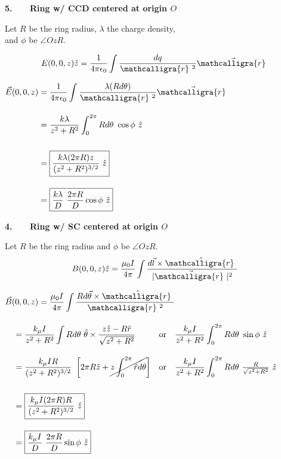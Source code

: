 \documentclass[12pt]{article}
\newcommand{\scripty}[1]{\ensuremath{\mathcalligra{#1}}}
\newcommand*{\cursrr}{\scripty{r}\ }
\begin{document}
\vspace{10pt}\noindent
\begin{minipage}[t]{.37\textwidth}
	\textbf{5. \ \ \ Ring w/ CCD centered at origin \(O\)}
	
	\vspace{10pt}
	Let \(R\) be the ring radius, \(\lambda\) the charge density, \\[7pt]
	and \(\phi\) be \(\angle OzR\).

	\vspace{5pt}
	\[ \displaystyle E(0,0,z) \hat{z} = \frac{1}{4 \pi \epsilon_0} \int \frac{dq}{\cursrr^2} \vec{\cursrr}\]

	\vspace{10pt}
	\(\begin{aligned}
		\vec{E}(0,0,z) &= \frac{1}{4 \pi \epsilon_0} \int \frac{\lambda (R d\theta)}{\cursrr^2} \vec{\cursrr}\\[10pt]
		&= \frac{k \lambda}{z^2 + R^2} \int_0^{2\pi} Rd\theta\ \cos{\phi}\ \hat{z} \\[15pt]
		&= \boxed{ \frac{k \lambda (2\pi R) z}{(z^2 + R^2)^{3/2}}\ \hat{z} }\\[10pt]
		&= \boxed{ \frac{k \lambda}{D}\ \frac{2\pi R}{D} \cos{\phi}\ \hat{z}}
	\end{aligned}\)
\end{minipage}
\hfill\vline\hfill
\begin{minipage}[t]{.57\textwidth}
	\textbf{4. \ \ \ Ring w/ SC centered at origin \(O\)}

	\vspace{10pt}
	Let \(R\) be the ring radius and \(\phi\) be \(\angle OzR\).
	\[ \displaystyle B(0,0,z) \hat{z} = \frac{\mu_0 I}{4 \pi} 
			\int \frac{ d\vec{l} \times \hat{\cursrr} }{| \vec{\cursrr} |^2} \]

	\vspace{5pt}
	\(\begin{aligned} 
		&\vec{B}(0,0,z) = \frac{\mu_0 I}{4 \pi} \int \frac{R d\vec{\theta} \times \hat{\cursrr}}{\cursrr^2}\\[10pt]
		&\ \ \ \begin{aligned}
			&= \frac{k_\mu I}{z^2 + R^2} \int R d\theta \ \hat{\theta} \times \frac{z\hat{z}-R\hat{r}}{\sqrt{z^2 + R^2}} 
				&&\text{or}\quad 
				\frac{k_\mu I}{z^2 + R^2} \int_0^{2\pi} R d\theta \ \sin{\phi}\ \hat{z}\\[10pt]
			&= \frac{k_\mu I R}{ (z^2 + R^2)^{3/2} } \ 
				\left[ 2 \pi R \hat{z} + \cancel{z \int_0^{2 \pi} \hat{r} d\theta} \right] 
				&&\text{or}\quad 
				\frac{k_\mu I}{z^2 + R^2} \int_0^{2\pi} R d\theta \ \tfrac{R}{\sqrt{z^2 + R^2}}\ \hat{z}\\[15pt]
			&= \boxed{ \frac{k_\mu I(2\pi R)R}{ (z^2 + R^2)^{3/2} } \ \hat{z} }\\[10pt]
			&= \boxed{ \frac{k_\mu I}{D}\ \frac{2\pi R}{D} \sin{\phi}\ \hat{z} }
		\end{aligned}
	\end{aligned}\)
\end{minipage}
\end{document}
